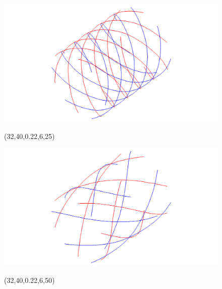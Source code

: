 \begin{figure} [H]
\begin{latexonly}
	\begin{minipage} [c] [] [c]{5.5cm} 
	\includegraphics [width =\textwidth] {images/WireStentD32L40d22n6b25}
	\begin{center}
	\vspace{-3ex}
	(32,40,0.22,6,25)
	\vspace{1ex}
	\end{center}
\end{minipage}
\hspace{0.3cm}
\begin{minipage} [c] [] [c] {5.5cm}
	\includegraphics [width =\textwidth] {images/WireStentD32L40d22n6b50}
	\begin{center}
	\vspace{-3ex}
	(32,40,0.22,6,50)
	\vspace{1ex}
	\end{center}
\end{minipage}
\hspace{0.3cm}
\hspace{0.1cm}
	\begin{minipage} [c] [] [c]{5.5cm} 

\end{minipage}
\end{latexonly}
\end{figure}
